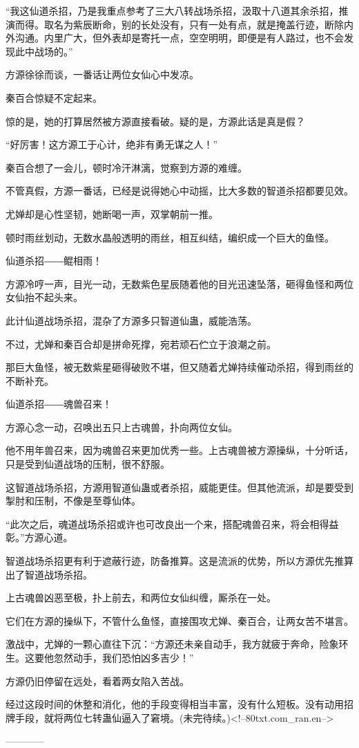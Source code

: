 \begin{this_body}
“我这仙道杀招，乃是我重点参考了三大八转战场杀招，汲取十八道其余杀招，推演而得。取名为紫辰断命，别的长处没有，只有一处有点，就是掩盖行迹，断除内外沟通。内里广大，但外表却是寄托一点，空空明明，即便是有人路过，也不会发现此中战场的。”

方源徐徐而谈，一番话让两位女仙心中发凉。

秦百合惊疑不定起来。

惊的是，她的打算居然被方源直接看破。疑的是，方源此话是真是假？

“好厉害！这方源工于心计，绝非有勇无谋之人！”

秦百合想了一会儿，顿时冷汗淋漓，觉察到方源的难缠。

不管真假，方源一番话，已经是说得她心中动摇，比大多数的智道杀招都要见效。

尤婵却是心性坚韧，她断喝一声，双掌朝前一推。

顿时雨丝划动，无数水晶般透明的雨丝，相互纠结，编织成一个巨大的鱼怪。

仙道杀招――鲲相雨！

方源冷哼一声，目光一动，无数紫色星辰随着他的目光迅速坠落，砸得鱼怪和两位女仙抬不起头来。

此计仙道战场杀招，混杂了方源多只智道仙蛊，威能浩荡。

不过，尤婵和秦百合却是拼命死撑，宛若顽石伫立于浪潮之前。

那巨大鱼怪，被无数紫星砸得破败不堪，但又随着尤婵持续催动杀招，得到雨丝的不断补充。

仙道杀招――魂兽召来！

方源心念一动，召唤出五只上古魂兽，扑向两位女仙。

他不用年兽召来，因为魂兽召来更加优秀一些。上古魂兽被方源操纵，十分听话，只是受到仙道战场的压制，很不舒服。

这智道战场杀招，方源用智道仙蛊或者杀招，威能更佳。但其他流派，却是要受到掣肘和压制，不像是至尊仙体。

“此次之后，魂道战场杀招或许也可改良出一个来，搭配魂兽召来，将会相得益彰。”方源心道。

智道战场杀招更有利于遮蔽行迹，防备推算。这是流派的优势，所以方源优先推算出了智道战场杀招。

上古魂兽凶恶至极，扑上前去，和两位女仙纠缠，厮杀在一处。

它们在方源的操纵下，不管什么鱼怪，直接围攻尤婵、秦百合，让两女苦不堪言。

激战中，尤婵的一颗心直往下沉：“方源还未亲自动手，我方就疲于奔命，险象环生。这要他忽然动手，我们恐怕凶多吉少！”

方源仍旧停留在远处，看着两女陷入苦战。

经过这段时间的休整和消化，他的手段变得相当丰富，没有什么短板。没有动用招牌手段，就将两位七转蛊仙逼入了窘境。(未完待续。)<!--80txt.com\_ran.en-->

------------

\end{this_body}


